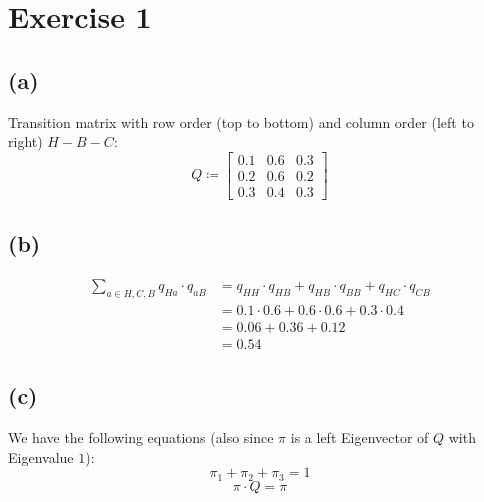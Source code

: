 \documentclass[12pt]{article}
\begin{document}
\section*{Exercise 1}
\subsection*{(a)}
\begin{center}
\end{center}
Transition matrix with row order (top to bottom) and column order (left to right) $H-B-C$:
\begin{equation*}
	Q \coloneqq \left[
		\begin{array}{ccc}
			0.1 & 0.6 & 0.3 \\
			0.2 & 0.6 & 0.2 \\
			0.3 & 0.4 & 0.3
		\end{array}
	\right]
\end{equation*}

\subsection*{(b)}
\begin{align*}
	\sum_{a \in {H,C,B}} q_{Ha} \cdot q_{aB} &= q_{HH} \cdot q_{HB} + q_{HB} \cdot q_{BB} + q_{HC} \cdot q_{CB} \\
	&= 0.1 \cdot 0.6 + 0.6 \cdot 0.6 + 0.3 \cdot 0.4 \\
	&= 0.06 + 0.36 + 0.12 \\
	&= 0.54
\end{align*}

\subsection*{(c)}
We have the following equations (also since $\pi$ is a left Eigenvector of $Q$ with Eigenvalue $1$):
\begin{equation}
	\pi_1 + \pi_2 + \pi_3 = 1
\end{equation}
\begin{equation}
	\pi \cdot Q = \pi
\end{equation}
\end{document}
